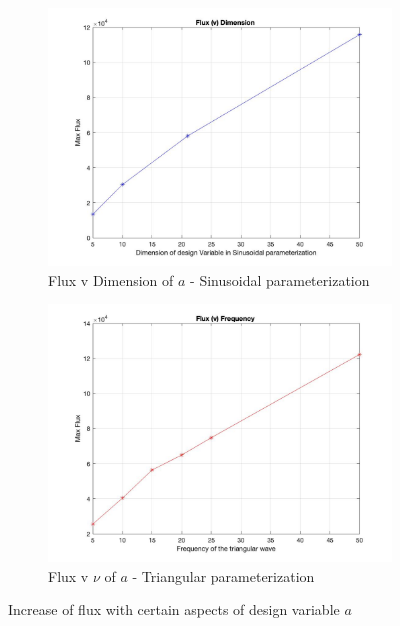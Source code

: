 \documentclass{article}
\begin{document}
\begin{figure}[h]
\centering
\begin{subfigure}[b]{0.45\textwidth}
\centering
\includegraphics[width = \textwidth]{Flux_v_Dim}
\caption{Flux v Dimension of $a$ - Sinusoidal parameterization}
\end{subfigure}
\hfill
\begin{subfigure}[b]{0.45\textwidth}
\centering
\includegraphics[width = \textwidth]{Flux_v_Freq}
\caption{Flux v $\nu$ of $a$ - Triangular parameterization}
\end{subfigure}
\caption{Increase of flux with certain aspects of design variable $a$}
\label{fig:FluxVDim}
\end{figure}
\end{document}

